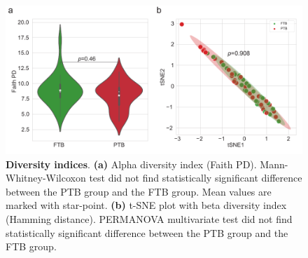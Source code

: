 \documentclass[11pt, a4paper, onecolumn, oneside]{report}
\begin{document}
            \begin{figure}[p]
                \centering
                \includegraphics[width=15 cm]{Figures/PTB/FigS1-Diversity.pdf}
                \caption[Diversity indices]{\textbf{Diversity indices}. \textbf{(a)} Alpha diversity index (Faith PD). Mann-Whitney-Wilcoxon test did not find statistically significant difference between the PTB group and the FTB group. Mean values are marked with star-point. \textbf{(b)} t-SNE plot with beta diversity index (Hamming distance). PERMANOVA multivariate test did not find statistically significant difference between the PTB group and the FTB group.}
                \label{fig:PTB-diversity}
            \end{figure}
            \clearpage
\end{document}

